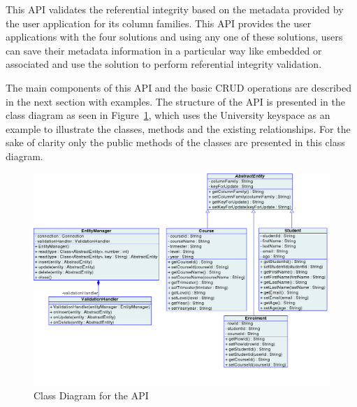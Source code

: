 This \ac{API} validates the referential integrity based on the metadata provided
by the user application for its column families.  This \ac{API} provides the
user applications with the four solutions and  using any one of these solutions,
users can save their metadata information in a particular way like embedded or associated and  use the
solution to perform referential integrity validation.  

The main components of this \ac{API} and the basic \ac{CRUD} operations are
described in the next section with examples. The structure of the \ac{API} is
presented in the class diagram as seen in Figure~\ref{f:classDiagram}, which
uses the University keyspace as an example to illustrate the classes,  methods and
the existing relationships. For the sake of clarity only the public methods of
the classes are presented in this class diagram.

\begin{figure}[h] 
	\centering
	\includegraphics[width=\textwidth]{./figure/Solutions/FinalClassDiagram.png}
	\caption{Class Diagram for the \ac{API}}\label{f:classDiagram}
\end{figure}

